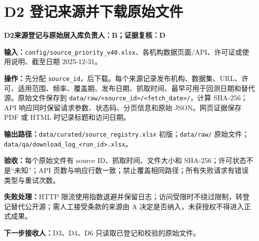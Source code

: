 \documentclass[UTF8,fontset=windows,12pt,openany]{ctexbook}
\newcommand{\Field}[1]{{\small\nolinkurl{#1}}}
\newcommand{\File}[1]{{\small\nolinkurl{#1}}}
\newcommand{\StepTitle}[3]{%
  \noindent\colorbox{DeepNavy}{\parbox{0.965\textwidth}{\color{white}\Large\bfseries #1\quad #2\hfill\normalsize #3}}\par\medskip
}
\newcommand{\CardRow}[2]{\noindent\textbf{#1：}#2\par}
\begin{document}
\section{D2 登记来源并下载原始文件}
\StepTitle{D2}{来源登记与原始层入库}{负责人：B；证据复核：D}
\CardRow{输入}{\File{config/source_priority_v40.xlsx}、各机构数据页面/API、许可证或使用说明、截至日期 2025-12-31。}
\CardRow{操作}{先分配 \Field{source_id}，后下载。每个来源记录发布机构、数据集、URL、许可、适用范围、频率、覆盖期、发布日期、抓取时间、最早可用于回测日期和替代源。原始文件保存到 \File{data/raw/<source_id>/<fetch_date>/}，计算 SHA-256；API 响应同时保留请求参数、状态码、分页信息和原始 JSON。网页证据保存 PDF 或 HTML 时记录标题和访问日期。}
\CardRow{输出路径}{\File{data/curated/source_registry.xlsx} 初版；\File{data/raw/} 原始文件；\File{data/qa/download_log_<run_id>.xlsx}。}
\CardRow{验收}{每个原始文件有 source ID、抓取时间、文件大小和 SHA-256；许可状态不是“未知”；API 页数与响应行数一致；禁止覆盖相同路径；所有失败请求有错误类型与重试次数。}
\CardRow{失败处理}{HTTP 限流使用指数退避并保留日志；访问受限时不绕过限制，转登记替代公开源；需人工接受条款的来源由 A 决定是否纳入，未获授权不得进入正式成果。}
\CardRow{下一步接收人}{D3、D4、D6 只读取已登记和校验的原始文件。}
\end{document}

